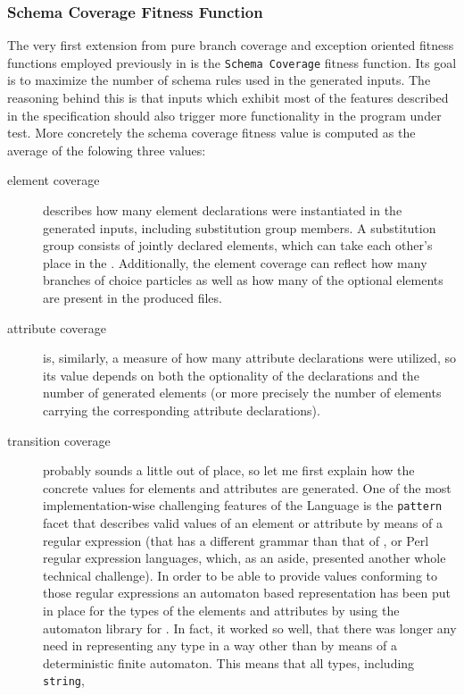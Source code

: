 \subsubsection{Schema Coverage Fitness Function}
\label{sec:fit:schema}
The very first extension from pure \java branch coverage and exception oriented fitness functions employed 
previously in \xmlmate is the \texttt{Schema Coverage} fitness function. Its goal is to maximize the number 
of schema rules used in the generated inputs. The reasoning behind this is that inputs which exhibit most of 
the features described in the specification should also trigger more functionality in the program under test. 
More concretely the schema coverage fitness value is computed as the average of the folowing three values:
\begin{description}
  \item[element coverage] describes how many element declarations were instantiated in the generated inputs, 
  including substitution group members. A substitution group consists of jointly declared elements, which 
  can take each other's place in the \xml. Additionally, the element coverage can reflect how many branches 
  of choice particles as well as how many of the optional elements are present in the produced files.
  \item[attribute coverage] is, similarly, a measure of how many attribute declarations were utilized, so its 
  value depends on both the optionality of the declarations and the number of generated elements (or more 
  precisely the number of elements carrying the corresponding attribute declarations).
  \item[transition coverage] probably sounds a little out of place, so let me first explain how the concrete 
  values for elements and attributes are generated. One of the most implementation-wise challenging features 
  of the \xsd{} {\small Language} is the \texttt{pattern} facet that describes valid values of an element or 
  attribute by means of a regular expression (that has a different grammar than that of \java, \python or 
  {\small Perl} regular expression languages, which, as an aside, presented another whole technical challenge). 
  In order to be able to provide values conforming to those regular expressions an automaton based representation 
  has been put in place for the types of the elements and attributes by using the automaton
  library\cite{automaton} for \java.
  In fact, it worked so well, that there was longer any need in representing any type in a way other than by
  means of a deterministic finite automaton. This means that all types, including \texttt{string},

\end{description}
